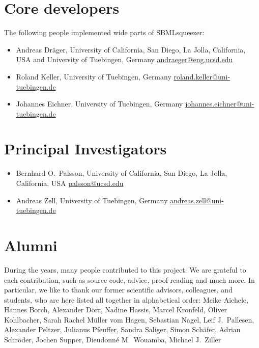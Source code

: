 \section{Core developers}

The following people implemented wide parts of SBMLsqueezer:
\begin{itemize}
\item Andreas Dr\"ager, 
  University of California, San Diego, La Jolla, California, USA and
  University of Tuebingen, Germany
  \href{mailto:andraeger@eng.ucsd.edu}{andraeger@eng.ucsd.edu}
\item Roland Keller,
  University of Tuebingen, Germany
  \href{mailto:roland.keller@uni-tuebingen.de}{roland.keller@uni-tuebingen.de}
\item Johannes Eichner,
  University of Tuebingen, Germany
  \href{mailto:johannes.eichner@uni-tuebingen.de}{johannes.eichner@uni-tuebingen.de}
\end{itemize}

\section{Principal Investigators}

\begin{itemize}
\item Bernhard O.~Palsson,
  University of California, San Diego, La Jolla, California, USA
  \href{mailto:palsson@ucsd.edu}{palsson@ucsd.edu}
\item Andreas Zell, 
  University of Tuebingen, Germany
  \href{mailto:andreas.zell@uni-tuebingen.de}{andreas.zell@uni-tuebingen.de}
\end{itemize}

\section{Alumni}

During the years, many people contributed to this project.
We are grateful to each contribution, such as source code, advice, proof reading
and much more. In particular, we like to thank our former scientific advisors,
colleagues, and students, who are here listed all together in alphabetical
order:
Meike Aichele,
Hannes Borch,
Alexander D\"orr,
Nadine Hassis,
Marcel Kronfeld,
Oliver Kohlbacher,
Sarah Rachel M\"uller vom Hagen,
Sebastian Nagel,
Leif J.~Pallesen,
Alexander Peltzer,
Julianus Pfeuffer,
Sandra Saliger,
Simon Sch\"afer,
Adrian Schr\"oder,
Jochen Supper,
Dieudonn\'e M.~Wouamba,
Michael J.~Ziller

